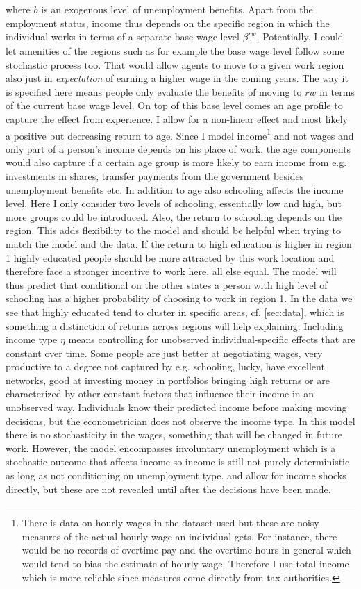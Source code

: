 where $b$ is an exogenous level of unemployment benefits. Apart from the employment status, income thus depends on the specific region in which the individual works in terms of a separate base wage level $\beta_0^{rw}$. Potentially, I could let amenities of the regions such as for example the base wage level follow some stochastic process too. That would allow  agents to move to a given work region also just in \textit{expectation} of earning a higher wage in the coming years. The way it is specified here means people only evaluate the benefits of moving to $rw$ in terms of the current base wage level. On top of this base level comes an age profile to capture the effect from experience. I allow for a non-linear effect and most likely a positive but decreasing return to age. Since I model income\footnote{There is data on hourly wages in the dataset used but these are noisy measures of the actual hourly wage an individual gets. For instance, there would be no records of overtime pay and the overtime hours in general which would tend to bias the estimate of hourly wage. Therefore I use total income which is more reliable since measures come directly from tax authorities.} and not wages and only part of a person's income depends on his place of work, the age components would also capture if a certain age group is more likely to earn income from e.g. investments in shares, transfer payments from the government besides unemployment benefits etc. In addition to age also schooling affects the income level. Here I only consider two levels of schooling, essentially low and high, but more groups could be introduced. Also, the return to schooling depends on the region. This adds flexibility to the model and should be helpful when trying to match the model and the data. If the return to high education is higher in region 1 highly educated people should be more attracted by this work location and therefore face a stronger incentive to work here, all else equal. The model will thus predict that conditional on the other states a person with high level of schooling has a higher probability of choosing to work in region 1. In the data we see that highly educated tend to cluster in specific areas, cf. \autoref{sec:data}, which is something a distinction of returns across regions will help explaining. Including income type $\eta$ means controlling for unobserved individual-specific effects that are constant over time. Some people are just better at negotiating wages, very productive to a degree not captured by e.g. schooling, lucky, have excellent networks, good at investing money in portfolios bringing high returns or are characterized by other constant factors that influence their income in an unobserved way. Individuals know their predicted income before making moving decisions, but the econometrician does not observe the income type. In this model there is no stochasticity in the wages, something that will be changed in future work. However, the model encompasses involuntary unemployment which is a stochastic outcome that affects income so income is still not purely deterministic as long as not conditioning on unemployment type. \citet{Oswald2015} and \citet{KennanWalker2011} allow for income shocks directly, but these are not revealed until after the decisions have been made. 


